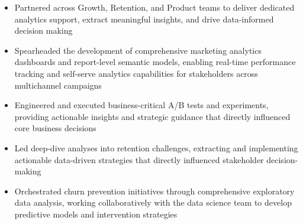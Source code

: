 \documentclass[10pt,a4paper,ragged2e,withhyper]{altacv}
\begin{document}
\vspace{1em}  %


\begin{paracol}{2}


\begin{itemize}
\item Partnered across Growth, Retention, and Product teams to deliver dedicated analytics support, extract meaningful insights, and drive data-informed decision making
\item Spearheaded the development of comprehensive marketing analytics dashboards and report-level semantic models, enabling real-time performance tracking and self-serve analytics capabilities for stakeholders across multichannel campaigns
\item Engineered and executed business-critical A/B tests and experiments, providing actionable insights and strategic guidance that directly influenced core business decisions
\item Led deep-dive analyses into retention challenges, extracting and implementing actionable data-driven strategies that directly influenced stakeholder decision-making
\item Orchestrated churn prevention initiatives through comprehensive exploratory data analysis, working collaboratively with the data science team to develop predictive models and intervention strategies
\end{itemize}


\end{paracol}
\end{document}
